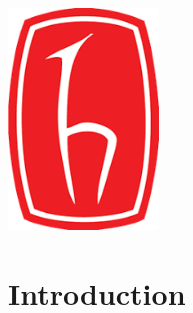 \begin{titlepage}




\includegraphics[width=0.3\textwidth]{logo.png} %
 

\vfill %

\end{titlepage}


\section{Introduction}

